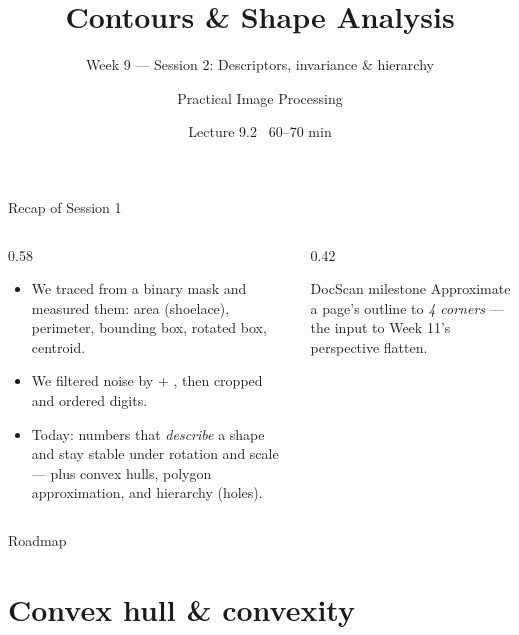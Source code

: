 \documentclass[10pt,aspectratio=169]{beamer}
\title{Contours \& Shape Analysis}
\subtitle{Week 9 — Session 2: Descriptors, invariance \& hierarchy}
\author{Practical Image Processing}
\date{Lecture 9.2 \textbullet\ 60--70 min}
\begin{document}
\maketitle

\begin{frame}{Recap of Session 1}
  \begin{columns}[T]
    \begin{column}{0.58\textwidth}
      \begin{itemize}
        \item We traced  from a binary mask and measured them: area (shoelace),
              perimeter, bounding box, rotated box, centroid.
        \item We filtered noise by  + , then cropped and ordered digits.
        \item \alert{Today:} numbers that \emph{describe} a shape and stay stable under rotation and
              scale — plus convex hulls, polygon approximation, and hierarchy (holes).
      \end{itemize}
    \end{column}
    \begin{column}{0.42\textwidth}
      \begin{alertblock}{DocScan milestone}
        Approximate a page's outline to \emph{4 corners} — the input to Week 11's perspective flatten.
      \end{alertblock}
    \end{column}
  \end{columns}
\end{frame}

\begin{frame}{Roadmap}\tableofcontents\end{frame}

\section{Convex hull \& convexity}
\end{document}
